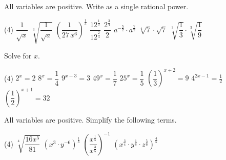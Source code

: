 \documentclass[14pt,a4paper,oneside]{extreport}
\numberwithin{taskcounter}{section}
\theoremstyle{definition}
\newenvironment{manualexercise}[1]{%
	\renewcommand\themanualexerciseinner{#1}%
	\manualexerciseinner
}{\endmanualexerciseinner}
\begin{document}
\begin{manualexercise}{8}
	All variables are positive. Write as a single rational power.
	\begin{tasks}(4)
		\task $\dfrac{1}{\sqrt{x}}$
		\task $\sqrt[3]{\dfrac{1}{\sqrt{a}}}$
		\task $\left(\dfrac{1}{27\,x^6}\right)^{\frac{1}{3}}$
		\task $\dfrac{12^{\frac{1}{3}}}{12^{\frac{2}{4}}}$
		\task $\dfrac{2^{\frac{3}{4}}}{2}$
		\task $a^{-\frac{5}{2}}\cdot a^\frac{7}{2}$
		\task $\sqrt[4]{7}\cdot\sqrt{7}$
		\task $\sqrt[3]{\dfrac{1}{3}}\cdot\sqrt[3]{\dfrac{1}{9}}$
	\end{tasks}
\end{manualexercise}
\vspace*{8pt}
\begin{manualexercise}{9}
	Solve for $x$.
	\begin{tasks}(4)
		\task $2^x=2$
		\task $8^x=\dfrac{1}{4}$
		\task $9^{x-3}=3$
		\task $49^x=\dfrac{1}{7}$
		\task $25^x=\dfrac{1}{5}$
		\task $\left(\dfrac{1}{3}\right)^{x+2}=9$
		\task $4^{2x-1}=\frac{1}{2}$
		\task $\left(\dfrac{1}{2}\right)^{x+1}=32$
	\end{tasks}
\end{manualexercise}
\vspace*{8pt}
\begin{manualexercise}{10}
	All variables are positive. Simplify the following terms.
	\begin{tasks}(4)
		\task $\sqrt[4]{\dfrac{16x^5}{81}}$
		\task $\left(x^3\cdot y^{-6}\right)^{\frac{1}{3}}$
		\task $\left(\dfrac{x^{\frac{1}{5}}}{x^{\frac{3}{5}}}\right)^{-1}$
		\task $\left(x^\frac{3}{4}\cdot y^\frac{1}{8}\cdot z^\frac{5}{6}\right)^\frac{4}{5}$
	\end{tasks}
\end{manualexercise}
\end{document}
